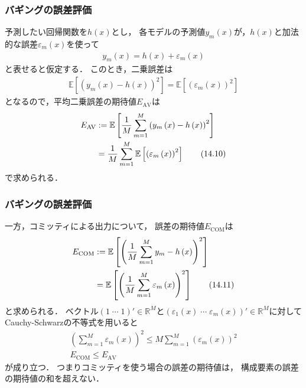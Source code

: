 \documentclass[10pt,hyperref={unicode}]{beamer}
\newcommand{\parentheses}[1]{\left(#1\right)}
\newcommand{\brackets}[1]{\left[#1\right]}
\begin{document}
\begin{frame}
\frametitle{バギングの誤差評価}
予測したい回帰関数を$h\parentheses{x}$とし，
各モデルの予測値$y_m\parentheses{x}$が，$h\parentheses{x}$と加法的な誤差$\varepsilon_m\parentheses{x}$を使って
\begin{align}
    y_m\parentheses{x} = h\parentheses{x} + \varepsilon_m\parentheses{x}
    \tag{14.8}
\end{align}
と表せると仮定する．
このとき，二乗誤差は
\begin{align}
    \mathbb{E}\brackets{%
        \parentheses{%
            y_m\parentheses{x} - h\parentheses{x}
        }^2
    }
    =
    \mathbb{E}\brackets{%
        \parentheses{%
            \varepsilon_m\parentheses{x}
        }^2
    }
    \tag{14.9}
\end{align}
となるので，平均二乗誤差の期待値$E_{\mathrm{AV}}$は
\begin{align}
    E_{\mathrm{AV}} &:=
    \mathbb{E}\brackets{%
            \frac{1}{M}
            \sum_{m = 1}^M
        \parentheses{%
            y_m\parentheses{x} - h\parentheses{x}
        }^2
    } \notag \\
    &= \frac{1}{M}
    \sum_{m = 1}^M
    \mathbb{E}\brackets{\parentheses{\varepsilon_m\parentheses{x}}^2}
    \tag{14.10}
\end{align}
で求められる．
\end{frame}

\begin{frame}
\frametitle{バギングの誤差評価}
一方，コミッティによる出力について，
誤差の期待値$E_\mathrm{COM}$は
\begin{align}
    E_{\mathrm{COM}} &:=
    \mathbb{E}\brackets{%
        \parentheses{%
            \frac{1}{M}\sum_{m = 1}^M y_m - h\parentheses{x}
        }^2
    } \notag \\
    &= \mathbb{E}\brackets{%
        \parentheses{%
            \frac{1}{M}\sum_{m = 1}^M\varepsilon_m\parentheses{x}
        }^2
    }
    \tag{14.11}
\end{align}
と求められる．
ベクトル$\parentheses{1 \; \cdots \; 1}' \in \mathbb{R}^M$と$\parentheses{\varepsilon_1\parentheses{x} \; \cdots \; \varepsilon_m\parentheses{x}}' \in \mathbb{R}^M$に対してCauchy-Schwarzの不等式を用いると
\begin{gather*}
    \parentheses{\sum_{m =1}^M \varepsilon_m\parentheses{x}}^2
    \leq
    M \sum_{m = 1}^M\parentheses{\varepsilon_m\parentheses{x}}^2 \\
    E_\mathrm{COM} \leq E_\mathrm{AV}
\end{gather*}
が成り立つ．
つまりコミッティを使う場合の誤差の期待値は，
構成要素の誤差の期待値の和を超えない．
\end{frame}
\end{document}
